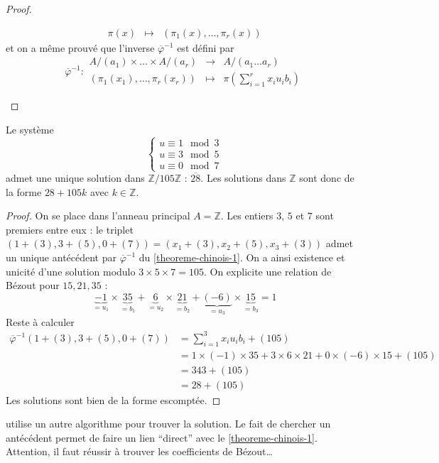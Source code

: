 \begin{proof}
\begin{enumerate}[label=(\roman*)]
\[\begin{array}{ccc}
          \pi(x) &\mapsto& (\pi_1(x), \dots, \pi_r(x))
        \end{array}
      \]
      et on a même prouvé que l'inverse $\overline{\varphi}^{-1}$ est défini par
      \[
      \overline{\varphi}^{-1} :
      \begin{array}{ccc}
        A/(a_1) \times \dots \times A/(a_r) &\rightarrow& A/(a_1 \dots a_r) \\
        (\pi_1(x_1), \dots, \pi_r(x_r)) &\mapsto& \pi \left( \sum_{i=1}^{r} x_i u_i b_i \right)
      \end{array}
      \]
    \end{enumerate}
  \end{proof}


  \begin{example}
    Le système
    \[
    \begin{cases}
      u \equiv 1 \mod 3 \\
      u \equiv 3 \mod 5 \\
      u \equiv 0 \mod 7
    \end{cases}
    \]
    admet une unique solution dans $\mathbb{Z}/105\mathbb{Z}$ : $\overline{28}$. Les solutions dans $\mathbb{Z}$ sont donc de la forme $28 + 105k$ avec $k \in \mathbb{Z}$.
  \end{example}

  \begin{proof}
    On se place dans l'anneau principal $A = \mathbb{Z}$. Les entiers $3$, $5$ et $7$ sont premiers entre eux : le triplet $(1 + (3), 3 + (5), 0 + (7)) = (x_1 + (3), x_2 + (5), x_3 + (3))$ admet un unique antécédent par $\overline{\varphi}^{-1}$ du \cref{theoreme-chinois-1}. On a ainsi existence et unicité d'une solution modulo $3 \times 5 \times 7 = 105$. On explicite une relation de Bézout pour $15, 21, 35$ :
    \[ \underbrace{-1}_{=u_1} \times \underbrace{35}_{=b_1} + \underbrace{6}_{=u_2} \times \underbrace{21}_{=b_2} + \underbrace{(-6)}_{=u_3} \times \underbrace{15}_{=b_3} = 1 \]
    Reste à calculer
    \begin{align*}
      \overline{\varphi}^{-1}(1 + (3), 3 + (5), 0 + (7)) &= \sum_{i=1}^3 x_i u_i b_i + (105) \\
      &= 1 \times (-1) \times 35 + 3 \times 6 \times 21 + 0 \times (-6) \times 15  + (105) \\
      &= 343 + (105) \\
      &= 28 + (105)
    \end{align*}
    Les solutions sont bien de la forme escomptée.
  \end{proof}

  \begin{remark}
    \cite{[ULM18]} utilise un autre algorithme pour trouver la solution. Le fait de chercher un antécédent permet de faire un lien ``direct'' avec le \cref{theoreme-chinois-1}. Attention, il faut réussir à trouver les coefficients de Bézout\dots
  \end{remark}

